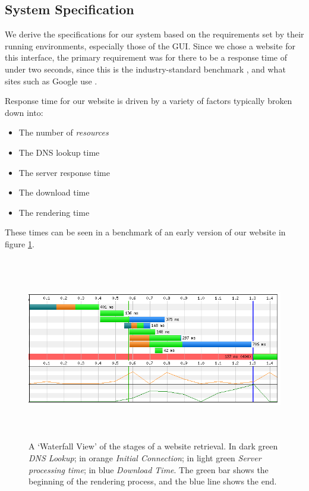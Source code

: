 

\subsection{System Specification}

We derive the specifications for our system based on the requirements
set by their running environments, especially those of the GUI. Since
we chose a website for this interface, the primary requirement was for
there to be a response time of under two seconds, since this is the
industry-standard benchmark \cite{akamai}, and what sites such as
Google use \cite{two-seconds}.

Response time for our website is driven by a variety of factors
typically broken down into:

\begin{itemize}
  \item The number of \emph{resources}
  \item The DNS lookup time
  \item The server response time
  \item The download time
  \item The rendering time
\end{itemize}

These times can be seen in a benchmark of an early version of our
website in figure \ref{fig-website-benchmark}.

\begin{figure}[htp]
  \centering
  \includegraphics[height=8cm]{graphics/performance.png}
  \caption{A `Waterfall View' of the stages of a website retrieval. In
  dark green \emph{DNS Lookup}; in orange \emph{Initial Connection};
  in light green \emph{Server processing time}; in blue \emph{Download
  Time}. The green bar shows the beginning of the rendering process,
and the blue line shows the end.}
  \label{fig-website-benchmark}
\end{figure}

